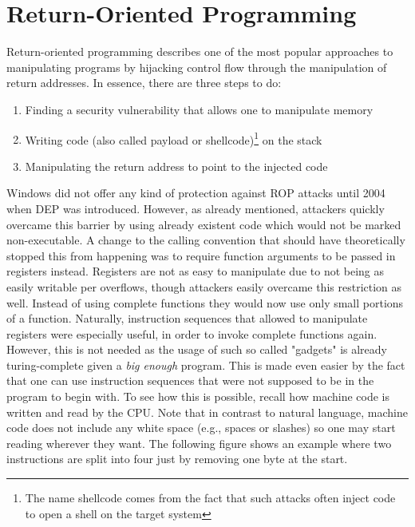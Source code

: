 \documentclass[10pt,twocolumn,a4paper]{article}
\begin{document}
\section{Return-Oriented Programming}\label{ROP}
Return-oriented programming describes one of the most popular approaches to manipulating programs by hijacking control flow through the manipulation of return addresses.
In essence, there are three steps to do:
\begin{enumerate}
	\item Finding a security vulnerability that allows one to manipulate memory
	\item Writing code (also called payload or shellcode)\footnote{The name shellcode comes from the fact that such attacks often inject code to open a shell on the target system} on the stack 
	\item Manipulating the return address to point to the injected code
\end{enumerate}
Windows did not offer any kind of protection against ROP attacks until 2004 when DEP was introduced.
However, as already mentioned, attackers quickly overcame this barrier by using already existent code which would not be marked non-executable\cite{solar}.
A change to the calling convention that should have theoretically stopped this from happening was to require function arguments to be passed in registers instead\cite{calling}. Registers are not as easy to manipulate due to not being as easily writable per overflows, though attackers easily overcame this restriction as well.
Instead of using complete functions they would now use only small portions of a function\cite{krahmer}. Naturally, instruction sequences that allowed to manipulate registers were especially useful, in order to invoke complete functions again.
However, this is not needed as the usage of such so called "gadgets" is already turing-complete given a \emph{big enough}\cite{gadgets} program.
This is made even easier by the fact that one can use instruction sequences that were not supposed to be in the program to begin with.
To see how this is possible, recall how machine code is written and read by the CPU.
Note that in contrast to natural language, machine code does not include any white space (e.g., spaces or slashes) so one may start reading wherever they want.
The following figure shows an example where two instructions are split into four just by removing one byte at the start.
\end{document}
